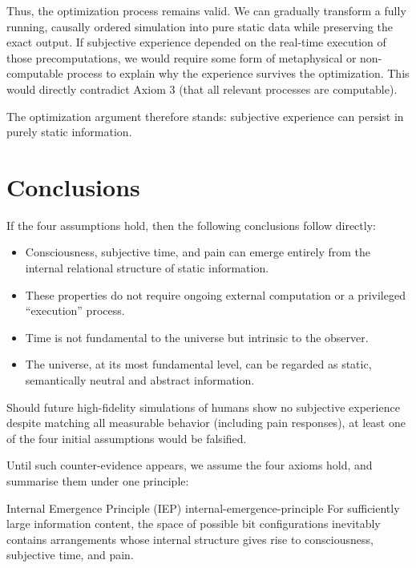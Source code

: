 Thus, the optimization process remains valid. We can gradually transform a fully running, causally ordered simulation into pure static data while preserving the exact output.
If subjective experience depended on the real-time execution of those precomputations, we would require some form of metaphysical or non-computable process to explain why the experience survives the optimization.
This would directly contradict Axiom 3 (that all relevant processes are computable).

The optimization argument therefore stands: subjective experience can persist in purely static information.



\section{Conclusions}


If the four assumptions hold, then the following conclusions follow directly:

\begin{itemize}
    \item Consciousness, subjective time, and pain can emerge entirely from the internal relational structure of static information.
    \item These properties do not require ongoing external computation or a privileged ``execution'' process.
    \item Time is not fundamental to the universe but intrinsic to the observer.
    \item The universe, at its most fundamental level, can be regarded as static, semantically neutral and abstract information.
\end{itemize}

Should future high-fidelity simulations of humans show no subjective experience despite matching all measurable behavior (including pain responses),
at least one of the four initial assumptions would be falsified. 

Until such counter-evidence appears, we assume the four axioms hold, and summarise them under one principle:

\begin{principle}{Internal Emergence Principle (IEP)}
{internal-emergence-principle}
For sufficiently large information content, the space of possible bit configurations inevitably contains arrangements whose internal structure gives rise to consciousness, subjective time, and pain.
\end{principle}
